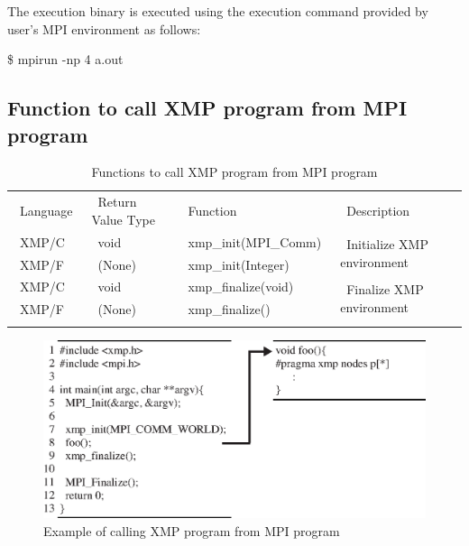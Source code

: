 \documentclass[graybox]{svmult}
\begin{document}
The execution binary is executed using the execution command provided by user's MPI environment as follows:
\begin{svgraybox}
\$ mpirun -np 4 a.out
\end{svgraybox}

\subsection{Function to call XMP program from MPI program}
\begin{table}[h]
\centering
\caption{Functions to call XMP program from MPI program\cite{pgas-ei}} \label{tab:XMPfromMPI}
\begin{tabular}{l|l|l|l}
\hline\noalign{\smallskip}
~Language~  & ~Return Value Type~ & ~Function & ~Description \\ 
\noalign{\smallskip}\svhline\noalign{\smallskip}
~XMP/C      & ~void              & ~xmp\_init(MPI\_Comm)~ & \multirow{2}{*}{~Initialize XMP environment~}\\
~XMP/F       & ~(None)          & ~xmp\_init(Integer) & \\ 
\noalign{\smallskip}\hline\noalign{\smallskip}
~XMP/C      & ~void              & ~xmp\_finalize(void) & \multirow{2}{*}{~Finalize XMP environment~}\\
~XMP/F       & ~(None)          & ~xmp\_finalize() & \\ 
\noalign{\smallskip}\hline\noalign{\smallskip}
\end{tabular}
\end{table}

\begin{figure}[h]
\sidecaption
\includegraphics[scale=.82]{img/program2.eps}
\caption{Example of calling XMP program from MPI program\cite{pgas-ei}} \label{fig:program2}
\end{figure}
\end{document}
